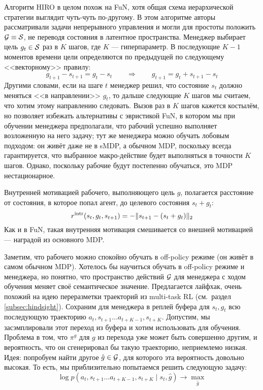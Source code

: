 Алгоритм HIRO в целом похож на FuN, хотя общая схема иерархической стратегии выглядит чуть-чуть по-другому. В этом алгоритме авторы рассматривали задачи непрерывного управления и могли для простоты положить $\mathcal{G} \equiv \mathcal{S}$, не переводя состояния в латентное пространства. Менеджер выбирает цель $g_t \in \mathcal{S}$ раз в $K$ шагов, где $K$ --- гиперпараметр. В последующие $K - 1$ моментов времени цели определяются по предыдущей по следующему <<векторному>> правилу:
$$g_{t + 1} - s_{t + 1} = g_t - s_t \qquad \Rightarrow \qquad g_{t + 1} = g_t + s_{t + 1} - s_t$$
Другими словами, если на шаге $t$ менеджер решил, что состояние $s_t$ должно меняться <<в направлении>> $g_t$, то дальше следующие $K$ шагов мы считаем, что хотим этому направлению следовать. Вызов раз в $K$ шагов кажется костылём, но позволяет избежать альтернативы с эвристикой FuN, в котором мы при обучении менеджера предполагали, что рабочий успешно выполняет возложенную на него задачу; тут же менеджера можно обучать лобовым подходом: он живёт даже не в sMDP, а обычном MDP, поскольку всегда гарантируется, что выбранное макро-действие будет выполняться в точности $K$ шагов. Однако, поскольку рабочие будут постепенно обучаться, это MDP нестационарное.

Внутренней мотивацией рабочего, выполняющего цель $g$, полагается расстояние от состояния, в которое попал агент, до целевого состояния $s_t + g_t$:
$$r^{\mathrm{intr}}(s_t, g_t, s_{t+1}) = -\|s_{t + 1} - (s_{t} + g_t)\|_2$$
Как и в FuN, такая внутренняя мотивация смешивается со внешней мотивацией --- наградой из основного MDP. 

Заметим, что рабочего можно спокойно обучать в off-policy режиме (он живёт в самом обычном MDP). Хотелось бы научиться обучать в off-policy режиме и менеджера, но понятно, что пространство действий $\mathcal{G}$ для менеджера с ходом обучения меняет своё семантическое значение. Предлагается лайфхак, очень похожий на идею переразметки траекторий из multi-task RL (см.~раздел \ref{subsec:hindsight}). Сохраним для менеджера в реплей буфера для $s_t, g_t$ всю последующую траекторию $a_t, s_{t+1} \dots a_{t + K - 1}, s_{t + K}$. Допустим, мы засэмплировали этот переход из буфера и хотим использовать для обучения. Проблема в том, что $\pi^g$ для $g$ из перехода уже может быть совершенно другим, и вероятность, что он сгенерировал бы такую траекторию, неприемлемо низкая. Идея: попробуем найти другое $\hat{g} \in \mathcal{G}$, для которого эта вероятность довольно высокая. То есть, мы приблизительно попытаемся решить следующую задачу:
$$\log p(a_t, s_{t+1} \dots a_{t + K - 1}, s_{t + K} \mid s_t, \hat{g}) \to \max_{\hat{g}}$$

